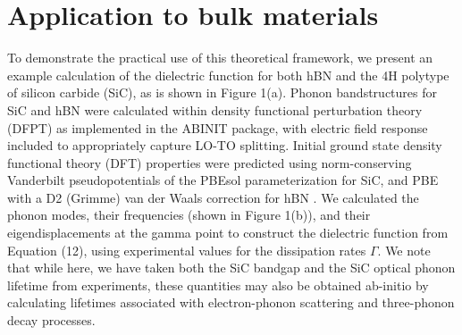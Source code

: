 \documentclass[superscriptaddress,reprint,prb]{revtex4-1}
\begin{document}
\section{Application to bulk materials}
To demonstrate the practical use of this theoretical framework, we present an example calculation of the dielectric function for both hBN and the 4H polytype of silicon carbide (SiC), as is shown in Figure 1(a). 
Phonon bandstructures for SiC and hBN were calculated within density functional perturbation
theory (DFPT) as implemented in the ABINIT package\cite{abinit1,abinit2,abinit3,Gonze1997dynamical,Hamann2005metric}, with electric field response included to appropriately capture LO-TO splitting. Initial ground state density functional theory (DFT) properties were predicted using norm-conserving Vanderbilt pseudopotentials of the PBEsol parameterization for SiC, and PBE with a D2 (Grimme) van der Waals correction for hBN \cite{PBEsol,PBE,ONCV_PPs,pseudodojo,grimme}. We calculated the phonon modes, their frequencies (shown in Figure 1(b)), and their eigendisplacements at the gamma point to construct the dielectric function from Equation (12), using experimental values for the dissipation rates $\Gamma$. We note that while here, we have taken both the SiC bandgap and the SiC optical phonon lifetime from experiments, these quantities may also be obtained ab-initio by calculating lifetimes associated with electron-phonon scattering and three-phonon decay processes. 
\end{document}
